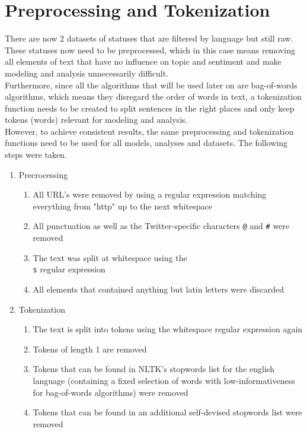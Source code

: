 \section{Preprocessing and Tokenization}
\label{sec:preprocessingAndTokenization}

There are now 2 datasets of statuses that are filtered by language but still raw.
These statuses now need to be preprocessed,
which in this case means removing all elements of text that have no influence on topic and sentiment and make
modeling and analysis unnecessarily difficult.\\
Furthermore, since all the algorithms that will be used later on are bag-of-words algorithms,
which means they disregard the order of words in text, a tokenization function needs to be created
to split sentences in the right places and only keep tokens (words) relevant for modeling and analysis.\\
However, to achieve consistent results,
the same preprocessing and tokenization functions need to be used for all models, analyses and datasets.
The following steps were taken.

\begin{enumerate}
    \item Precrocessing
    \begin{enumerate}
        \item All URL's were removed by using a regular expression matching everything from "http" up to the next whitespace
        \item All punctuation as well as the Twitter-specific characters \texttt{@} and \texttt{#} were removed
        \item The text was split at whitespace using the \texttt{\\s} regular expression
        \item All elements that contained anything but latin letters were discarded
    \end{enumerate}
    \item Tokenization
    \begin{enumerate}
        \item The text is split into tokens using the whitespace regular expression again
        \item Tokens of length 1 are removed
        \item Tokens that can be found in NLTK's stopwords list for the english language
        (containing a fixed selection of words with low-informativeness for bag-of-words algorithms) were removed
        \item Tokens that can be found in an additional self-devised stopwords list were removed %
    \end{enumerate}
\end{enumerate}

